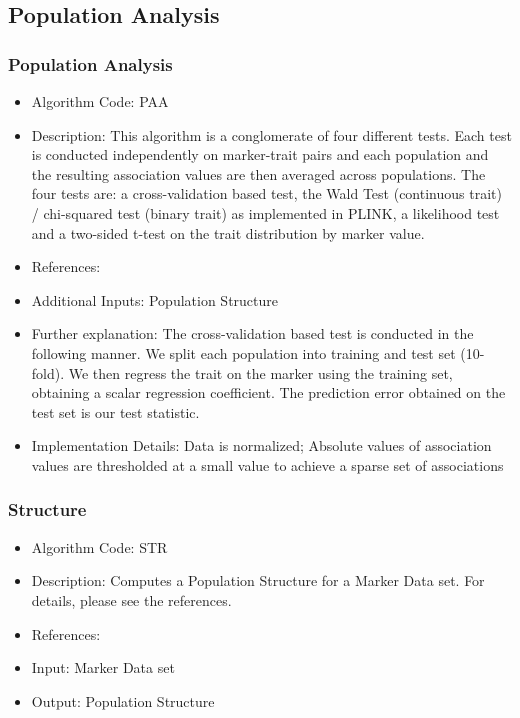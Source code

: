 \documentclass{article}
\begin{document}
\subsection{Population Analysis}

\subsubsection{Population Analysis}
\begin{itemize}
\item Algorithm Code: PAA
\item Description: This algorithm is a conglomerate of four different tests. Each test is conducted independently on marker-trait pairs and each population and the resulting association values are then averaged across populations. The four tests are: a cross-validation based test, the Wald Test (continuous trait) / chi-squared test (binary trait) as implemented in PLINK, a likelihood test and a two-sided t-test on the trait distribution by marker value.
\item References: \cite{PopAnal} \cite{PLINK} \cite{LikelihoodTest}
\item Additional Inputs: Population Structure
\item Further explanation: The cross-validation based test is conducted in the following manner. We split each population into training and test set (10-fold). We then regress the trait on the marker using the training set, obtaining a scalar regression coefficient. The prediction error obtained on the test set is our test statistic.
\item Implementation Details: Data is normalized; Absolute values of association values are thresholded at a small value to achieve a sparse set of associations
\end{itemize}


\subsubsection{Structure}

\begin{itemize}
\item Algorithm Code: STR
\item Description: Computes a Population Structure for a Marker Data set. For details, please see the references.
\item References: \cite{Structure} \cite{StructureLink}
\item Input: Marker Data set
\item Output: Population Structure
\end{itemize}
\end{document}
